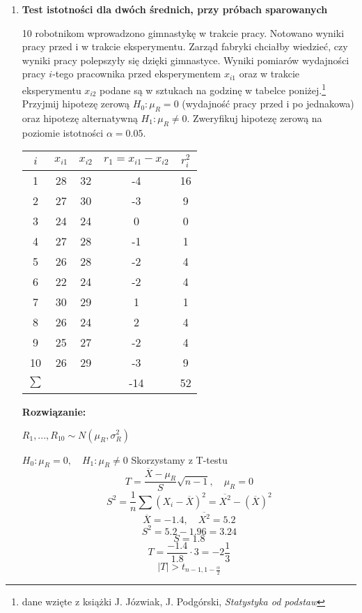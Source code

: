 \documentclass[11pt]{article}
\begin{document}
\begin{enumerate}
    \item \textbf{Test istotności dla dwóch średnich, przy próbach sparowanych}
    \par 
    10 robotnikom wprowadzono gimnastykę w trakcie pracy. Notowano wyniki pracy przed i w trakcie eksperymentu. Zarząd fabryki chciałby wiedzieć, czy wyniki pracy polepszyły się dzięki gimnastyce. Wyniki pomiarów wydajności pracy \(i\)-tego pracownika przed eksperymentem \(x_{i1}\) oraz w trakcie eksperymentu \(x_{i2}\) podane są w sztukach na godzinę w tabelce poniżej.\footnote{dane wzięte z książki J. Józwiak, J. Podgórski, \textit{Statystyka od podstaw}} Przyjmij hipotezę zerową \(H_0: \mu_{R} = 0\)  (wydajność pracy przed i po jednakowa) oraz hipotezę alternatywną  \(H_1: \mu_{R} \neq 0\). Zweryfikuj hipotezę zerową na poziomie istotności \(\alpha = 0.05\). 
    \begin{center}
    \begin{tabular}{ |c|c|c|c|c| } 
    \hline
    \(i\) & \(x_{i1}\) & \(x_{i2}\) & \(r_1 = x_{i1} - x_{i2}\) & \(r_i^2\) \\ 
    \hline 
    1 & 28 & 32 & -4 & 16 \\ 
    2 & 27 & 30 & -3 & 9  \\  
    3 & 24 & 24 & 0 & 0 \\
    4 & 27 & 28 & -1 & 1 \\
    5 & 26 & 28 & -2 & 4 \\
    6 & 22 & 24 & -2 & 4 \\
    7 & 30 & 29 & 1 & 1 \\
    8 & 26 & 24 & 2 & 4 \\
    9 & 25 & 27 & -2 & 4 \\
    10 & 26 & 29 & -3 & 9 \\
    \hline
    \(\sum\) & & & -14 & 52 \\
    \hline
    \end{tabular}
    \end{center}
    \textbf{Rozwiązanie: }
    \par 
    \(R_1, ..., R_{10} \sim N(\mu_{R}, \sigma^2_R)\)
    \par 
    \(H_0 : \mu_R = 0, \quad H_1: \mu_R \neq 0\)
    Skorzystamy z T-testu
    \[T = \frac{\overline{X}- \mu_R}{S} \sqrt{n-1}, \quad \mu_R = 0\]
    \[S^2 = \frac{1}{n} \sum(X_i - \overline{X})^2 = \overline{X^2} - (\overline{X})^2\]
    \[\overline{X} = -1.4, \quad \overline{X^2} = 5.2\]
    \[S^2 = 5.2 - 1.96 = 3.24\]
    \[S = 1.8\]
    \[T = \frac{-1.4}{1.8} \cdot 3 = -2 \frac{1}{3}\]
    \[|T| > t_{n-1, 1 - \frac{\alpha}{2}}\]

\end{enumerate}
\end{document}
